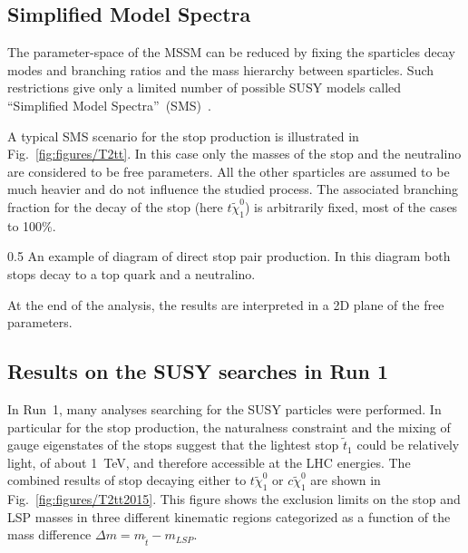 




\subsection{Simplified Model Spectra~\label{sec:SMS}}

The parameter-space of the MSSM can be reduced by fixing the sparticles decay modes and branching ratios and the mass hierarchy between sparticles. Such restrictions give only a limited number of possible SUSY models called ``Simplified Model Spectra''~(SMS)~\cite{Alves:2011wf, Alwall:2008ag, Chatrchyan:2013sza}.

A typical SMS scenario for the stop production is illustrated in Fig.~\ref{fig:figures/T2tt}. In this case only the masses of the stop and the neutralino are considered to be free parameters. All the other sparticles are assumed to be much heavier and do not influence the studied process. The associated branching fraction for the decay of the stop (here $t \tilde{\chi}_{1}^0$) is arbitrarily fixed, most of the cases to 100\%.

                 {0.5}       %
                 { An example of diagram of direct stop pair production. In this diagram both stops decay to a top quark and a neutralino.} 


At the end of the analysis, the results are interpreted in a 2D plane of the free parameters.

\subsection{Results on the SUSY searches in Run 1}

In Run~1, many analyses searching for the SUSY particles were performed. In particular for the stop production, the naturalness constraint and the mixing of gauge eigenstates of the stops suggest that the lightest stop $\tilde{t}_{1}$ could be relatively light, of about 1~TeV, and therefore accessible at the LHC energies. The combined results of stop decaying either to $t \tilde{\chi}_{1}^0$ or $c \tilde{\chi}_{1}^0$ are shown in Fig.~\ref{fig:figures/T2tt2015}. This figure shows the exclusion limits on the stop and LSP masses in three different kinematic regions categorized as a function of the mass difference  $\Delta m = m_{\tilde{t}} - m_{LSP}$.


